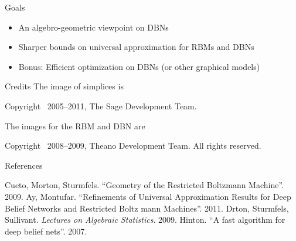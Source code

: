 \documentclass[mathserif,xcolor=dvipsnames]{beamer}
\begin{document}
\begin{frame}{Goals}
    \begin{itemize}
    \item An algebro-geometric viewpoint on DBNs
    \item Sharper bounds on universal approximation for RBMs and DBNs
    \item Bonus: Efficient optimization on DBNs (or other graphical models)
    \end{itemize}
\end{frame}

\begin{frame}{Credits}
    The image of simplices is
    \begin{center}
    {\scriptsize
    Copyright \textcopyright\, 2005--2011, The Sage Development Team. 
    }
    \end{center}
    The images for the RBM and DBN are
    \begin{center}
    {\scriptsize
    Copyright \textcopyright\, 2008--2009, Theano Development Team. All rights reserved.
    }
    \end{center}
\end{frame}

\begin{frame}{References}
\begin{thebibliography}{100}
     Cueto, Morton, Sturmfels. ``Geometry of the Restricted
    Boltzmann Machine''.  2009.
      Ay, Montufar.  ``Refinements of Universal Approximation
     Results for Deep Belief Networks and Restricted Boltz mann Machines''.
     2011.
     Drton, Sturmfels, Sullivant. \textit{Lectures on Algebraic
    Statistics}. 2009.
     Hinton.  ``A fast algorithm for deep belief nets''.  2007.
\end{thebibliography}

\end{frame}
    
\end{document}
